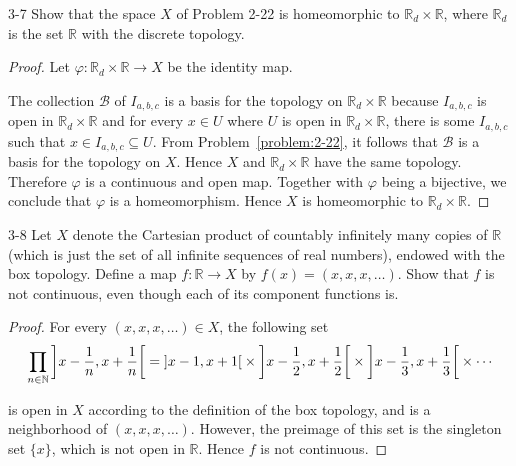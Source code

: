 \begin{problem}{3-7}
Show that the space $X$ of Problem 2-22 is homeomorphic to $\mathbb{R}_{d}\times\mathbb{R}$, where $\mathbb{R}_{d}$ is the set $\mathbb{R}$ with the discrete topology.
\end{problem}

\begin{proof}
    Let $\varphi: \mathbb{R}_{d}\times\mathbb{R}\to X$ be the identity map.

    The collection $\mathscr{B}$ of $I_{a,b,c}$ is a basis for the topology on $\mathbb{R}_{d}\times\mathbb{R}$ because $I_{a,b,c}$ is open in $\mathbb{R}_{d}\times\mathbb{R}$ and for every $x\in U$ where $U$ is open in $\mathbb{R}_{d}\times\mathbb{R}$, there is some $I_{a,b,c}$ such that $x\in I_{a,b,c} \subseteq U$. From Problem~\ref{problem:2-22}, it follows that $\mathscr{B}$ is a basis for the topology on $X$. Hence $X$ and $\mathbb{R}_{d}\times\mathbb{R}$ have the same topology. Therefore $\varphi$ is a continuous and open map. Together with $\varphi$ being a bijective, we conclude that $\varphi$ is a homeomorphism. Hence $X$ is homeomorphic to $\mathbb{R}_{d}\times\mathbb{R}$.
\end{proof}

\begin{problem}{3-8}
Let $X$ denote the Cartesian product of countably infinitely many copies of $\mathbb{R}$ (which is just the set of all infinite sequences of real numbers), endowed with the box topology. Define a map $f: \mathbb{R}\to X$ by $f(x) = (x, x, x, \ldots)$. Show that $f$ is not continuous, even though each of its component functions is.
\end{problem}

\begin{proof}
    For every $(x, x, x, \ldots) \in X$, the following set
    \begin{align*}
        \prod_{n\in\mathbb{N}}\left]{x - \frac{1}{n}, x + \frac{1}{n}}\right[ = \left]{x - 1, x + 1}\right[ \times \left]{x - \frac{1}{2}, x + \frac{1}{2}}\right[ \times \left]{x - \frac{1}{3}, x + \frac{1}{3}}\right[ \times \cdots
    \end{align*}

    is open in $X$ according to the definition of the box topology, and is a neighborhood of $(x, x, x, \ldots)$. However, the preimage of this set is the singleton set $\{ x \}$, which is not open in $\mathbb{R}$. Hence $f$ is not continuous.
\end{proof}

